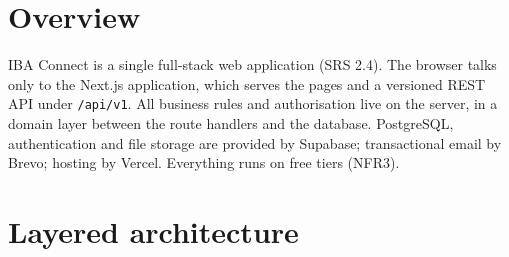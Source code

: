 \documentclass[10pt,a4paper]{article}
\begin{document}
\makedoctitle

\section{Overview}
IBA Connect is a single full-stack web application (SRS 2.4). The browser talks only to the Next.js application, which serves the pages and a versioned REST API under \texttt{/api/v1}. All business rules and authorisation live on the server, in a domain layer between the route handlers and the database. PostgreSQL, authentication and file storage are provided by Supabase; transactional email by Brevo; hosting by Vercel. Everything runs on free tiers (NFR3).

\section{Layered architecture}
\end{document}
